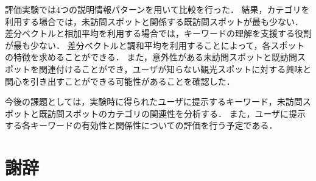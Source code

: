 \documentclass{deimj}
\begin{document}
評価実験では4つの説明情報パターンを用いて比較を行った．
結果，カテゴリを利用する場合では，未訪問スポットと関係する既訪問スポットが最も少ない．
差分ベクトルと相加平均を利用する場合では，キーワードの理解を支援する役割が最も少ない．
差分ベクトルと調和平均を利用することによって，各スポットの特徴を求めることができる．
また，意外性がある未訪問スポットと既訪問スポットを関連付けることができ，ユーザが知らない観光スポットに対する興味と関心を引き出すことができる可能性があることを確認した．

今後の課題としては，実験時に得られたユーザに提示するキーワード，未訪問スポットと既訪問スポットのカテゴリの関連性を分析する．
また，ユーザに提示する各キーワードの有効性と関係性についての評価を行う予定である．


\section*{謝辞}
\end{document}
